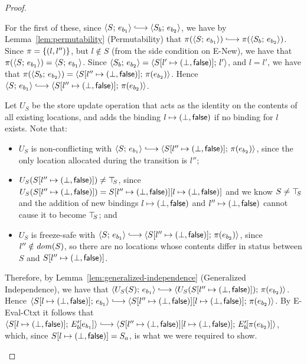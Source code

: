 \begin{proof}
\begin{enumerate}
\begin{enumerate}
\begin{itemize}
          For the first of these, since $\config{S}{e_{b_1}}
          \parstepsto \config{S_b}{e_{b_2}}$, we have by
          Lemma~\ref{lem:permutability} (Permutability) that
          $\pi(\config{S}{e_{b_1}}) \parstepsto
          \pi(\config{S_b}{e_{b_2}})$.  Since $\pi = \left\{(l,
            l'')\right\}$, but $l \notin S$ (from the side condition on {\sc
            E-New}), we have that $\pi(\langle S;\, e_{b_1} \rangle) =
          \langle S;\, e_{b_1} \rangle$. Since $\langle S_b;\, e_{b_2} \rangle =
          \langle S[l' \mapsto (\bot, \textsf{false})];\, l' \rangle$, and $l = l'$, we have
          that $\pi(\langle S_b;\, e_{b_2} \rangle) =
          \langle S[l'' \mapsto (\bot, \textsf{false})];\, \pi(e_{b_2}) \rangle$.  Hence
          $\config{S}{e_{b_1}} \parstepsto
          \config{\extS{S}{l''}{\bot}{\frozenfalse}}{\pi(e_{b_2})}$.

          Let $U_S$ be the store update operation that acts as the
          identity on the contents of all existing locations, and adds
          the binding $l \mapsto (\bot, \textsf{false})$ if no
          binding for $l$ exists.  Note that:
          \begin{itemize}
          \item $U_S$ is non-conflicting with $\config{S}{e_{b_1}}
            \parstepsto
            \config{\extS{S}{l''}{\bot}{\frozenfalse}}{\pi(e_{b_2})}$,
            since the only location allocated during the transition is
            $l''$;
          \item $U_S(S[l'' \mapsto (\bot, \textsf{false})]) \neq \top\hspace{-0.85mm}_{S}$,
            since $U_S(S[l'' \mapsto (\bot, \textsf{false})]) =
            S[l'' \mapsto (\bot, \textsf{false})][l \mapsto (\bot, \textsf{false})]$
            and we know $S \neq \top\hspace{-0.85mm}_{S}$ and the addition of new
            bindings $l \mapsto (\bot, \textsf{false})$ and
            $l'' \mapsto (\bot, \textsf{false})$ cannot cause it
            to become $\top\hspace{-0.85mm}_{S}$; and
          \item $U_S$ is freeze-safe with $\config{S}{e_{b_1}}
            \parstepsto
            \config{\extS{S}{l''}{\bot}{\frozenfalse}}{\pi(e_{b_2})}$,
            since $l'' \notin \mathit{dom}(S)$, so there are no locations
            whose contents differ in status between $S$ and
            $S[l'' \mapsto (\bot, \textsf{false})]$.
          \end{itemize}

          Therefore, by Lemma~\ref{lem:generalized-independence}
          (Generalized Independence), we have that
          $\config{U_S(S)}{e_{b_1}} \parstepsto
          \config{U_S(\extS{S}{l''}{\bot}{\frozenfalse})}{\pi(e_{b_2})}$.
          Hence $\config{\extS{S}{l}{\bot}{\frozenfalse}}{e_{b_1}}
          \parstepsto
          \config{\extS{\extS{S}{l''}{\bot}{\frozenfalse}}{l}{\bot}{\frozenfalse}}{\pi(e_{b_2})}$.
          By {\sc E-Eval-Ctxt} it follows that
          $\config{\extS{S}{l}{\bot}{\frozenfalse}}{\evalctxt{E'_b}{e_{b_1}}}
          \parstepsto
          \config{\extS{\extS{S}{l''}{\bot}{\frozenfalse}}{l}{\bot}{\frozenfalse}}{\evalctxt{E'_b}{\pi(e_{b_2})}}$,
          which, since $S[l \mapsto (\bot, \textsf{false})] = S_a$, is
          what we were required to show.


\end{itemize}
\end{enumerate}
\end{enumerate}
\end{proof}
